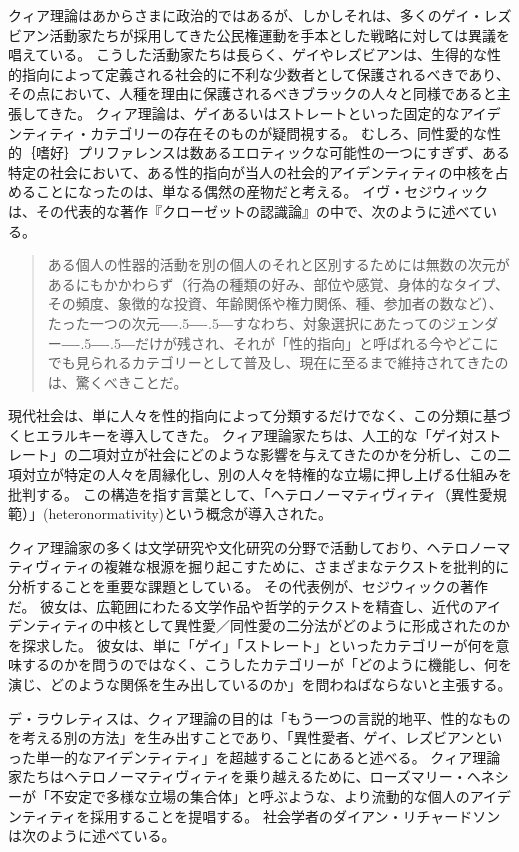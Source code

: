 \documentclass[paper=a4,book,openany]{jlreq}
\newcommand{\ig}[1]{}           %
\def\DDASH{―\kern-.5\zw―\kern-.5\zw―} %
\begin{document}
クィア理論はあからさまに政治的ではあるが、しかしそれは、多くのゲイ・レズビアン活動家たちが採用してきた公民権運動を手本とした戦略に対しては異議を唱えている。
こうした活動家たちは長らく、ゲイやレズビアンは、生得的な性的指向によって定義される社会的に不利な少数者として保護されるべきであり、その点において、人種を理由に保護されるべきブラックの人々と同様であると主張してきた。
クィア理論は、ゲイあるいはストレートといった固定的なアイデンティティ・カテゴリーの存在そのものが疑問視する。
むしろ、同性愛的な性的｛嗜好｝{プリファレンス}は数あるエロティックな可能性の一つにすぎず、ある特定の社会において、ある性的指向が当人の社会的アイデンティティの中核を占めることになったのは、単なる偶然の産物だと考える。
イヴ・セジウィックは、その代表的な著作『クローゼットの認識論』の中で、次のように述べている。

\begin{quote}
  ある個人の性器的活動を別の個人のそれと区別するためには無数の次元があるにもかかわらず（行為の種類の好み、部位や感覚、身体的なタイプ、その頻度、象徴的な投資、年齢関係や権力関係、種、参加者の数など）、たった一つの次元{\DDASH}すなわち、対象選択にあたってのジェンダー{\DDASH}だけが残され、それが「性的指向」と呼ばれる今やどこにでも見られるカテゴリーとして普及し、現在に至るまで維持されてきたのは、驚くべきことだ。
\citep{sedgwick90:_epist_closet}

\end{quote}

現代社会は、単に人々を性的指向によって分類するだけでなく、この分類に基づくヒエラルキーを導入してきた。
クィア理論家たちは、人工的な「ゲイ対ストレート」の二項対立が社会にどのような影響を与えてきたのかを分析し、この二項対立が特定の人々を周縁化し、別の人々を特権的な立場に押し上げる仕組みを批判する。
この構造を指す言葉として、「ヘテロノーマティヴィティ（異性愛規範）」(heteronormativity)という概念が導入された\citep{warner91:_introd}。

クィア理論家の多くは文学研究や文化研究の分野で活動しており、ヘテロノーマティヴィティの複雑な根源を掘り起こすために、さまざまなテクストを批判的に分析することを重要な課題としている。
その代表例が、セジウィックの著作だ。
彼女は、広範囲にわたる文学作品や哲学的テクストを精査し、近代のアイデンティティの中核として異性愛／同性愛の二分法がどのように形成されたのかを探求した。
彼女は、単に「ゲイ」「ストレート」といったカテゴリーが何を意味するのかを問うのではなく、こうしたカテゴリーが「どのように機能し、何を演じ、どのような関係を生み出しているのか」を問わねばならないと主張する\citep[p.27]{sedgwick90:_epist_closet}。

デ・ラウレティスは、クィア理論の目的は「もう一つの言説的地平、性的なものを考える別の方法」を生み出すことであり、「異性愛者、ゲイ、レズビアンといった単一的なアイデンティティ」を超越することにあると述べる\citep[p.iv]{lauretis91:_diff}。
クィア理論家たちはヘテロノーマティヴィティを乗り越えるために、ローズマリー・ヘネシーが「不安定で多様な立場の集合体」と呼ぶような、より流動的な個人のアイデンティティを採用することを提唱する\citep[p.965]{hennessy93:_queer_theor}。
社会学者のダイアン・リチャードソン\ig{Diane Richardson}は次のように述べている。
\end{document}
